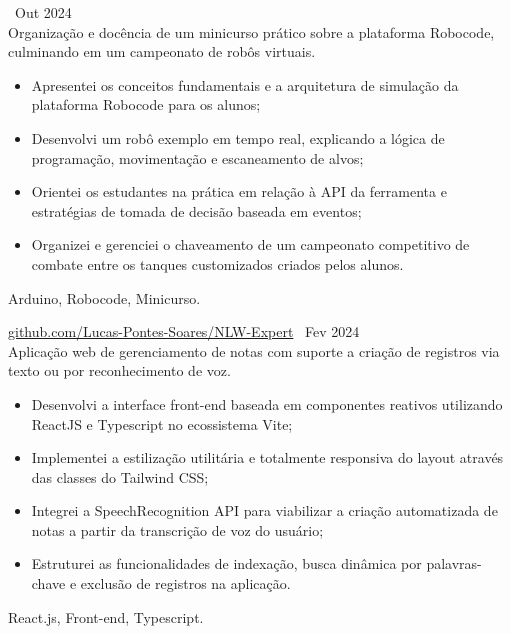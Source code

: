  \hfill\ Out 2024 \\
Organização e docência de um minicurso prático sobre a plataforma Robocode, culminando em um campeonato de robôs virtuais.
\begin{itemize}
    \item Apresentei os conceitos fundamentais e a arquitetura de simulação da plataforma Robocode para os alunos;
    \item Desenvolvi um robô exemplo em tempo real, explicando a lógica de programação, movimentação e escaneamento de alvos;
    \item Orientei os estudantes na prática em relação à API da ferramenta e estratégias de tomada de decisão baseada em eventos;
    \item Organizei e gerenciei o chaveamento de um campeonato competitivo de combate entre os tanques customizados criados pelos alunos.
\end{itemize}
 Arduino, Robocode, Minicurso.

        
 \textbar{}  \href{https://github.com/Lucas-Pontes-Soares/NLW-Expert}{github.com/Lucas-Pontes-Soares/NLW-Expert} \hfill\ Fev 2024 \\
Aplicação web de gerenciamento de notas com suporte a criação de registros via texto ou por reconhecimento de voz.
\begin{itemize}
    \item Desenvolvi a interface front-end baseada em componentes reativos utilizando ReactJS e Typescript no ecossistema Vite;
    \item Implementei a estilização utilitária e totalmente responsiva do layout através das classes do Tailwind CSS;
    \item Integrei a SpeechRecognition API para viabilizar a criação automatizada de notas a partir da transcrição de voz do usuário;
    \item Estruturei as funcionalidades de indexação, busca dinâmica por palavras-chave e exclusão de registros na aplicação.
\end{itemize}
 React.js, Front-end, Typescript.

        
